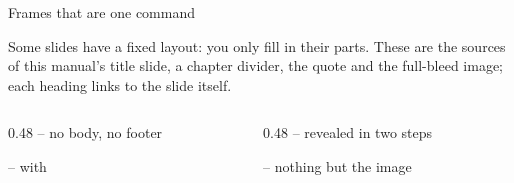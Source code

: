 
\begin{standardframe}{Frames that are one command}
	{\small Some slides have a fixed layout: you only fill in their parts. These
	are the sources of this manual's title slide, a chapter divider, the quote and
	the full-bleed image; each heading links to the slide itself.\par}
	\medskip
	\begin{columns}[t,onlytextwidth]
		\begin{column}{0.48\linewidth}
			 -- no body, no footer\par\smallskip
			\par\bigskip
			 -- with \par\smallskip
		\end{column}
		\begin{column}{0.48\linewidth}
			 -- revealed in two steps\par\smallskip
			\par\bigskip
			 -- nothing but the image\par\smallskip
		\end{column}
	\end{columns}
\end{standardframe}
